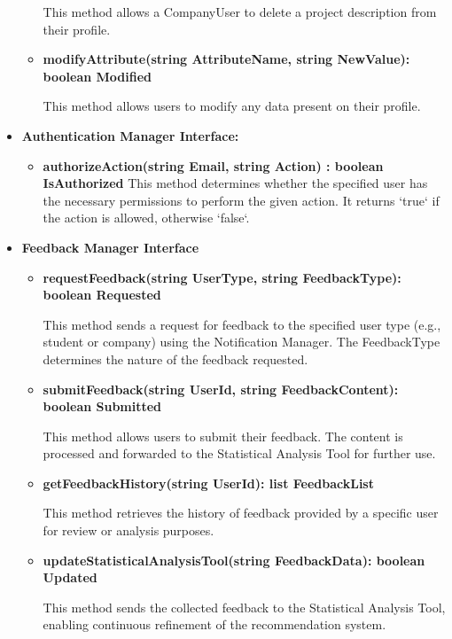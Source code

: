 \begin{itemize}
\begin{itemize}
    This method allows a CompanyUser to delete a project description from their profile.

    \item \textbf{modifyAttribute(string AttributeName, string NewValue): boolean Modified}
    
    This method allows users to modify any data present on their profile.
    \end{itemize}

\item \textbf{Authentication Manager Interface:}
\begin{itemize}

\item \textbf{authorizeAction(string Email, string Action) : boolean IsAuthorized}  
This method determines whether the specified user has the necessary permissions to perform the given action. It returns `true` if the action is allowed, otherwise `false`.


\end{itemize}

\item \textbf{Feedback Manager Interface}
    \begin{itemize}
    \item \textbf{requestFeedback(string UserType, string FeedbackType): boolean Requested}

    This method sends a request for feedback to the specified user type (e.g., student or company) using the Notification Manager. The FeedbackType determines the nature of the feedback requested.

    \item \textbf{submitFeedback(string UserId, string FeedbackContent): boolean Submitted}

    This method allows users to submit their feedback. The content is processed and forwarded to the Statistical Analysis Tool for further use.

    \item \textbf{getFeedbackHistory(string UserId): list FeedbackList}

    This method retrieves the history of feedback provided by a specific user for review or analysis purposes.

    \item \textbf{updateStatisticalAnalysisTool(string FeedbackData): boolean Updated}

    This method sends the collected feedback to the Statistical Analysis Tool, enabling continuous refinement of the recommendation system.


\end{itemize}
\end{itemize}
